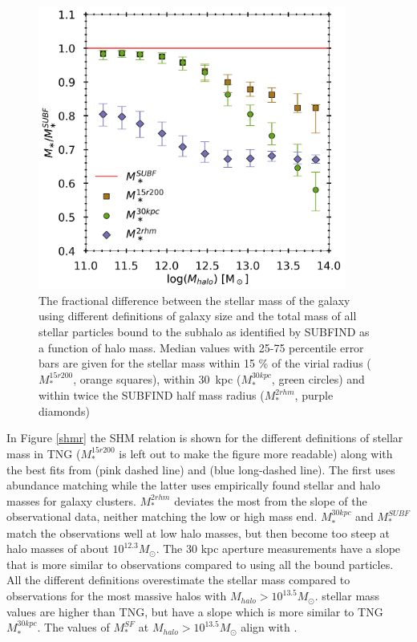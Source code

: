 \begin{figure}
    \centering
    \includegraphics[width=0.9\textwidth]{images/HM_fSM.png}
    \caption{The fractional difference between the stellar mass of the galaxy using different definitions of galaxy size and the total mass of all stellar particles bound to the subhalo as identified by SUBFIND as a function of halo mass. Median values with 25-75 percentile error bars are given for the stellar mass within 15 \% of the virial radius ($M_\ast^{15r200}$, orange squares), within 30$\,$ kpc ($M_\ast^{30kpc}$, green circles) and within twice the SUBFIND half mass radius ($M_\ast^{2rhm}$, purple diamonds)}
    \label{HM_fSM}
\end{figure}


In Figure \ref{shmr} the SHM relation is shown for the different definitions of stellar mass in TNG ($M_\ast^{15r200}$ is left out to make the figure more readable) along with the best fits from \textcite{Behroozi2019} (pink dashed line) and \textcite{Kravtsov2018} (blue long-dashed line). The first uses abundance matching while the latter uses empirically found stellar and halo masses for galaxy clusters. $M_\ast^{2rhm}$ deviates the most from the slope of the observational data, neither matching the low or high mass end. $M_\ast^{30kpc}$ and $M^{SUBF}_\ast$ match the observations well at low halo masses, but then become too steep at halo masses of about $10^{12.3} M_\odot$. The 30 kpc aperture measurements have a slope that is more similar to observations compared to using all the bound particles. All the different definitions overestimate the stellar mass compared to \textcite{Behroozi2019} observations for the most massive halos with $M_{halo} > 10^{13.5} M_\odot$. \textcite{Kravtsov2018} stellar mass values are higher than TNG, but have a slope which is more similar to TNG $M_\ast^{30kpc}$. The values of $M^{SF}_\ast$ at $M_{halo} > 10^{13.5} M_\odot$ align with \textcite{Kravtsov2018}. 

